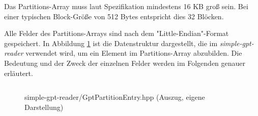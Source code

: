 Das Partitions-Array muss laut Spezifikation mindestens 16 KB groß sein. Bei einer typischen Block-Größe von 512 Bytes entspricht dies 32 Blöcken.\cite{apple-gpt}

Alle Felder des Partitions-Arrays sind nach dem "Little-Endian"-Format gespeichert.
In Abbildung \ref{fig:GptPartitionEntry.hpp} ist die Datenstruktur dargestellt, die im \textit{simple-gpt-reader} verwendet wird, um ein Element im Partitions-Array abzubilden.
Die Bedeutung und der Zweck der einzelnen Felder werden im Folgenden genauer erläutert.

\begin{figure}[ht]
    \inputminted[baselinestretch=1.2, tabsize=4, breaklines, frame=single]{c++}{content/code/simple-gpt-reader/GptPartitionEntry.hpp}
    
    \vspace{-0.5cm}

    \caption{simple-gpt-reader/GptPartitionEntry.hpp (Auszug, eigene Darstellung)}
    \label{fig:GptPartitionEntry.hpp}
\end{figure}

